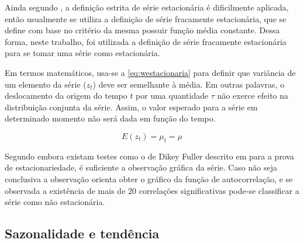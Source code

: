 \documentclass[
    12pt,
    oneside,
    a4paper,
    english,
    brazil
]{abntex2}
\begin{document}
Ainda segundo , a definição  estrita de série estacionária é
dificilmente  aplicada,  então  usualmente  se utiliza  a  definição  de  série
fracamente estacionária,  que se define com  base no critério da  mesma possuir
função média  constante. Dessa forma,  neste trabalho, foi utilizada a
definição  de  série fracamente  estacionária  para  se  tomar uma  série  como
estacionária.

Em  termos matemáticos,  usa-se a  \autoref{eq:westacionaria} para  definir que
variância  de um  elemento da  série ($z_t$)  deve ser  semelhante à  média. Em
outras  palavras, o  deslocamento da  origem do  tempo $t$  por uma  quantidade
$\tau$ não  exerce efeito  na distribuição  conjunta da  série. Assim,  o valor
esperado para a série em determinado momento não será dada em função do tempo.

\begin{equation}
    \label{eq:westacionaria}
    E(z_t) = \mu_t = \mu
\end{equation}






Segundo   embora existam testes  como o  de Dikey
Fuller  descrito  em    para a  prova  de  estacionariedade,
é  suficiente  a observação  gráfica  da  série.  Caso  não seja  conclusiva  a
observação  orienta obter  o gráfico da função de
autocorrelação,  e  se  observada  a  existência  de  mais  de  20  correlações
significativas pode-se classificar a série como não estacionária.

\subsection{Sazonalidade e tendência}
\end{document}
